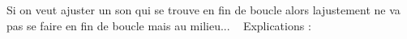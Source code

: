 
\begin{DoxyRefList}
\item[\label{bug__bug000001}%
\hypertarget{bug__bug000001}{}%
Membre \hyperlink{class_loop_ac69e73a7f3b87ecdc51e3840505b6599}{Loop.Adjust\+Sound} (Game\+Object sph)]Si on veut ajuster un son qui se trouve en fin de boucle alors l\textquotesingle{}ajustement ne va pas se faire en fin de boucle mais au milieu... ~\newline
 Explications \+:
\end{DoxyRefList}